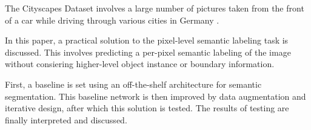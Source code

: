 The Cityscapes Dataset involves a large number of pictures taken from the front of a car while driving through various cities in Germany \cite{Cordts2016Cityscapes}.

In this paper, a practical solution to the pixel-level semantic labeling task is discussed.
This involves predicting a per-pixel semantic labeling of the image without consiering higher-level object instance or boundary information.

First, a baseline is set using an off-the-shelf architecture for semantic segmentation.
This baseline network is then improved by data augmentation and iterative design, after which this solution is tested.
The results of testing are finally interpreted and discussed.